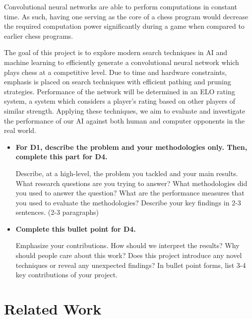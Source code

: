 \documentclass[letterpaper]{article} %
\begin{document}
Convolutional neural networks are able to perform computations in constant time. As such, having one serving as the core of a chess program would decrease the required computation power significantly during a game when compared to earlier chess programs.

The goal of this project is to explore modern search techniques in AI and machine learning to efficiently generate a convolutional neural network which plays chess at a competitive level. Due to time and hardware constraints, emphasis is placed on search techniques with efficient pathing and pruning strategies. Performance of the network will be determined in an ELO rating system, a system which considers a player's rating based on other players of similar strength. Applying these techniques, we aim to evaluate and investigate the performance of our AI against both human and computer opponents in the real world.

%
\begin{itemize} 

\item 
{\bf For D1, describe the problem and your methodologies only.  Then, complete this part for D4. }

Describe, at a high-level, the problem you tackled and your main results.  What research questions are you trying to answer?   What methodologies did you used to answer the question? What are the performance measures that you used to evaluate the methodologies?   Describe your key findings in 2-3 sentences. (2-3 paragraphs)

\item 
{\bf Complete this bullet point for D4.}

Emphasize your contributions.  How should we interpret the results?  Why should people care about this work?   Does this project introduce any novel techniques or reveal any unexpected findings?  In bullet point forms, list 3-4 key contributions of your project.

\end{itemize}

\newpage
\section{Related Work} 
\end{document}
